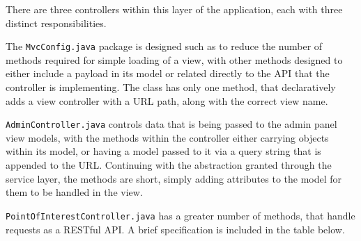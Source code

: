There are three controllers within this layer of the application, each with three distinct responsibilities.

The \texttt{MvcConfig.java} package is designed such as to reduce the number of methods required for simple loading of a view, with other methods designed to either include a payload in its model or related directly to the API that the controller is implementing. The class has only one method, that declaratively adds a view controller with a URL path, along with the correct view name.

\texttt{AdminController.java} controls data that is being passed to the admin panel view models, with the methods within the controller either carrying objects within its model, or having a model passed to it via a query string that is appended to the URL. Continuing with the abstraction granted through the service layer, the methods are short, simply adding attributes to the model for them to be handled in the view.

\texttt{PointOfInterestController.java} has a greater number of methods, that handle requests as a RESTful API. A brief specification is included in the table below.

\begin{table}[H]
\centering
{}
\caption{API endpoints for /poi}
\label{tab:poi-endpoints}
\end{table}

